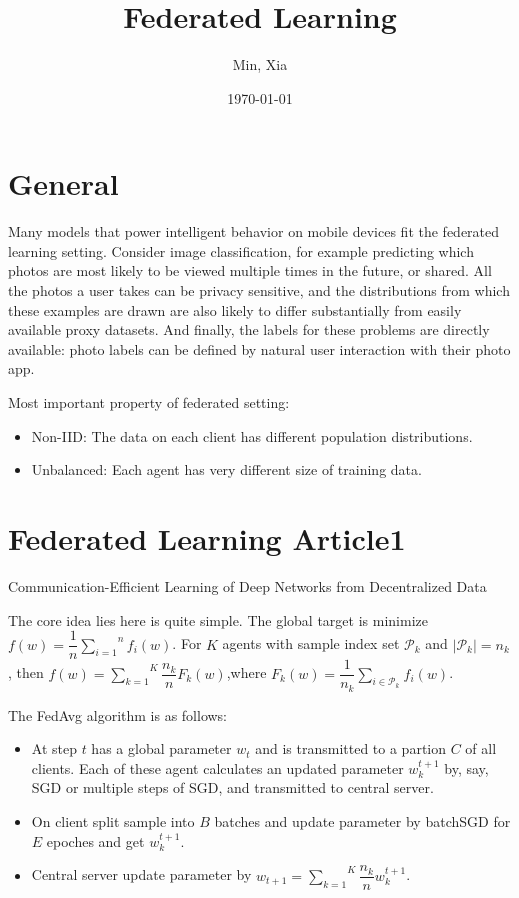 \documentclass[12pt, a4paper, oneside]{article}
\title{\textbf{Federated Learning}}
\author{Min, Xia}
\date{\today}
\begin{document}
\maketitle
\setcounter{page}{1}
\section{General}
    Many models that power intelligent behavior on mobile devices fit the federated learning setting. Consider image classification, for example predicting which photos are most likely to be viewed multiple times in the future, or shared. All the photos a user takes can be privacy sensitive, and the distributions from which these examples are drawn are also likely to differ substantially from easily available proxy datasets. And finally, the labels for these problems are directly available: photo labels can be defined by natural user interaction with their photo app.


    Most important property of federated setting:
    \begin{itemize}
        \item Non-IID: The data on each client has different population distributions.
        \item Unbalanced: Each agent has very different size of training data.
    \end{itemize}


\section{Federated Learning Article1}
    Communication-Efficient Learning of Deep Networks from Decentralized Data\cite{mcmahan2017communication}


    The core idea lies here is quite simple. The global target is minimize $f(w)=\dfrac{1}{n}\overset{n}{\underset{i=1}\sum}f_i(w)$. For $K$ agents with sample index set $\mathcal{P}_k$ and $|\mathcal{P}_k|=n_k$, then $f(w)=\overset{K}{\underset{k=1}\sum}\dfrac{n_k}{n}F_k(w)$,where $F_k(w)=\dfrac{1}{n_k}\overset{}{\underset{i\in\mathcal{P}_k}\sum}f_i(w)$.


    The FedAvg algorithm is as follows:
    \begin{itemize}
        \item At step $t$ has a global parameter $w_t$ and is transmitted to a partion $C$ of all clients. Each of these agent calculates an updated parameter $w_k^{t+1}$ by, say, SGD or multiple steps of SGD, and transmitted to central server.
        \item On client split sample into $B$ batches and update parameter by batchSGD for $E$ epoches and get $w_k^{t+1}$.
        \item Central server update parameter by $w_{t+1}=\overset{K}{\underset{k=1}\sum}\dfrac{n_k}{n}w_k^{t+1}$.
    \end{itemize}
\end{document}
